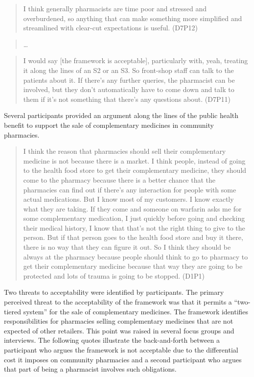 \documentclass[12pt,]{article}
\begin{document}
\begin{quote}
I think generally pharmacists are time poor and stressed and
overburdened, so anything that can make something more simplified and
streamlined with clear-cut expectations is useful. (D7P12)
\end{quote}

\begin{quote}
\ldots{}
\end{quote}

\begin{quote}
I would say {[}the framework is acceptable{]}, particularly with, yeah,
treating it along the lines of an S2 or an S3. So front-shop staff can
talk to the patients about it. If there's any further queries, the
pharmacist can be involved, but they don't automatically have to come
down and talk to them if it's not something that there's any questions
about. (D7P11)
\end{quote}

Several participants provided an argument along the lines of the public
health benefit to support the sale of complementary medicines in
community pharmacies.

\begin{quote}
I think the reason that pharmacies should sell their complementary
medicine is not because there is a market. I think people, instead of
going to the health food store to get their complementary medicine, they
should come to the pharmacy because there is a better chance that the
pharmacies can find out if there's any interaction for people with some
actual medications. But I know most of my customers. I know exactly what
they are taking. If they come and someone on warfarin asks me for some
complementary medication, I just quickly before going and checking their
medical history, I know that that's not the right thing to give to the
person. But if that person goes to the health food store and buy it
there, there is no way that they can figure it out. So I think they
should be always at the pharmacy because people should think to go to
pharmacy to get their complementary medicine because that way they are
going to be protected and lots of trauma is going to be stopped. (D1P1)
\end{quote}

Two threats to acceptability were identified by participants. The
primary perceived threat to the acceptability of the framework was that
it permits a ``two-tiered system'' for the sale of complementary
medicines. The framework identifies responsibilities for pharmacies
selling complementary medicines that are not expected of other
retailers. This point was raised in several focus groups and interviews.
The following quotes illustrate the back-and-forth between a participant
who argues the framework is not acceptable due to the differential cost
it imposes on community pharmacies and a second participant who argues
that part of being a pharmacist involves such obligations.
\end{document}
